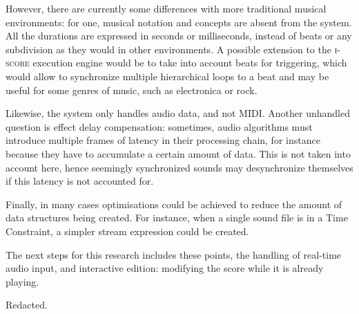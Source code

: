 \documentclass{article}
\newcommand*{\iscore}{\textsc{i-score}\xspace}
\begin{document}
However, there are currently some differences with more traditional musical environments: for one, musical notation and concepts are absent from the system.
All the durations are expressed in seconds or milliseconds, instead of beats or any subdivision as they would in other environments. 
A possible extension to the \iscore execution engine would be to take into account beats for triggering, which would allow to synchronize multiple hierarchical loops to a beat and may be useful for some genres of music, such as electronica or rock.

Likewise, the system only handles audio data, and not MIDI.
Another unhandled question is effect delay compensation: sometimes, audio algorithms must introduce multiple frames of latency in their processing chain, for instance because they have to accumulate a certain amount of data.
This is not taken into account here, hence seemingly synchronized sounds may desynchronize themselves if this latency is not accounted for.

Finally, in many cases optimisations could be achieved to reduce the amount of data structures being created. For instance, when a single sound file is in a Time Constraint, a simpler stream expression could be created.

The next steps for this research includes these points, the handling of real-time audio input, and interactive edition: modifying the score while it is already playing.

\begin{acknowledgments}
Redacted.%
\end{acknowledgments} 


\end{document}
